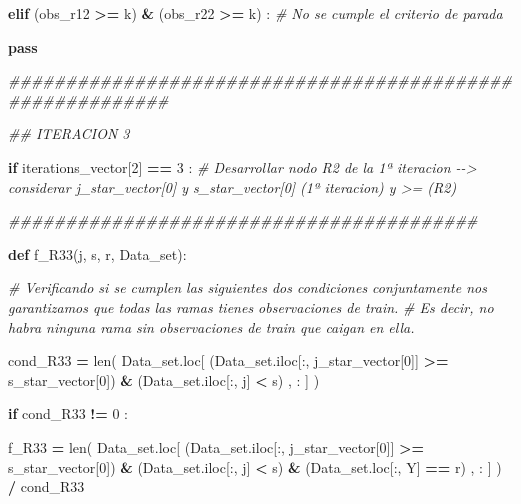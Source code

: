 \documentclass[
  11pt,
  a4paper,
]{article}
\newenvironment{Shaded}{\begin{snugshade}}{\end{snugshade}}
\newcommand{\BuiltInTok}[1]{#1}
\newcommand{\CommentTok}[1]{\textcolor[rgb]{0.56,0.35,0.01}{\textit{#1}}}
\newcommand{\ControlFlowTok}[1]{\textcolor[rgb]{0.13,0.29,0.53}{\textbf{#1}}}
\newcommand{\DecValTok}[1]{\textcolor[rgb]{0.00,0.00,0.81}{#1}}
\newcommand{\KeywordTok}[1]{\textcolor[rgb]{0.13,0.29,0.53}{\textbf{#1}}}
\newcommand{\NormalTok}[1]{#1}
\newcommand{\OperatorTok}[1]{\textcolor[rgb]{0.81,0.36,0.00}{\textbf{#1}}}
\newcommand{\StringTok}[1]{\textcolor[rgb]{0.31,0.60,0.02}{#1}}
\begin{document}
\begin{Shaded}
\begin{Highlighting}[]
        \ControlFlowTok{elif}\NormalTok{ (obs\_r12 }\OperatorTok{\textgreater{}=}\NormalTok{ k) }\OperatorTok{\&}\NormalTok{ (obs\_r22 }\OperatorTok{\textgreater{}=}\NormalTok{ k) : }\CommentTok{\# No se cumple el criterio de parada}

            \ControlFlowTok{pass}



\CommentTok{\#\#\#\#\#\#\#\#\#\#\#\#\#\#\#\#\#\#\#\#\#\#\#\#\#\#\#\#\#\#\#\#\#\#\#\#\#\#\#\#\#\#\#\#\#\#\#\#\#\#\#\#\#\#\#\#\#\#}

\CommentTok{\#\# ITERACION 3}

    \ControlFlowTok{if}\NormalTok{ iterations\_vector[}\DecValTok{2}\NormalTok{] }\OperatorTok{==} \DecValTok{3}\NormalTok{ :  }\CommentTok{\# Desarrollar nodo R2 de la 1ª iteracion {-}{-}\textgreater{}  considerar j\_star\_vector[0] y s\_star\_vector[0] (1ª iteracion) y \textgreater{}= (R2)}

       \CommentTok{\#\#\#\#\#\#\#\#\#\#\#\#\#\#\#\#\#\#\#\#\#\#\#\#\#\#\#\#\#\#\#\#\#\#\#\#\#\#\#\#\#}

        \KeywordTok{def}\NormalTok{ f\_R33(j, s, r, Data\_set):}

           \CommentTok{\# Verificando si se cumplen las siguientes dos condiciones conjuntamente nos garantizamos que todas las ramas tienes observaciones de train. }
           \CommentTok{\# Es decir, no habra ninguna rama sin observaciones de train que caigan en ella.}

\NormalTok{            cond\_R33 }\OperatorTok{=} \BuiltInTok{len}\NormalTok{( Data\_set.loc[ (Data\_set.iloc[:, j\_star\_vector[}\DecValTok{0}\NormalTok{]] }\OperatorTok{\textgreater{}=}\NormalTok{ s\_star\_vector[}\DecValTok{0}\NormalTok{]) }\OperatorTok{\&}\NormalTok{ (Data\_set.iloc[:, j] }\OperatorTok{\textless{}}\NormalTok{ s) , : ] ) }

            \ControlFlowTok{if}\NormalTok{  cond\_R33 }\OperatorTok{!=} \DecValTok{0}\NormalTok{ :}

\NormalTok{                f\_R33 }\OperatorTok{=} \BuiltInTok{len}\NormalTok{( Data\_set.loc[ (Data\_set.iloc[:, j\_star\_vector[}\DecValTok{0}\NormalTok{]] }\OperatorTok{\textgreater{}=}\NormalTok{ s\_star\_vector[}\DecValTok{0}\NormalTok{]) }\OperatorTok{\&}\NormalTok{ (Data\_set.iloc[:, j] }\OperatorTok{\textless{}}\NormalTok{ s) }\OperatorTok{\&}\NormalTok{ (Data\_set.loc[:, }\StringTok{\textquotesingle{}Y\textquotesingle{}}\NormalTok{] }\OperatorTok{==}\NormalTok{ r) , : ] ) }\OperatorTok{/}\NormalTok{ cond\_R33}


\end{Highlighting}
\end{Shaded}
\end{document}
